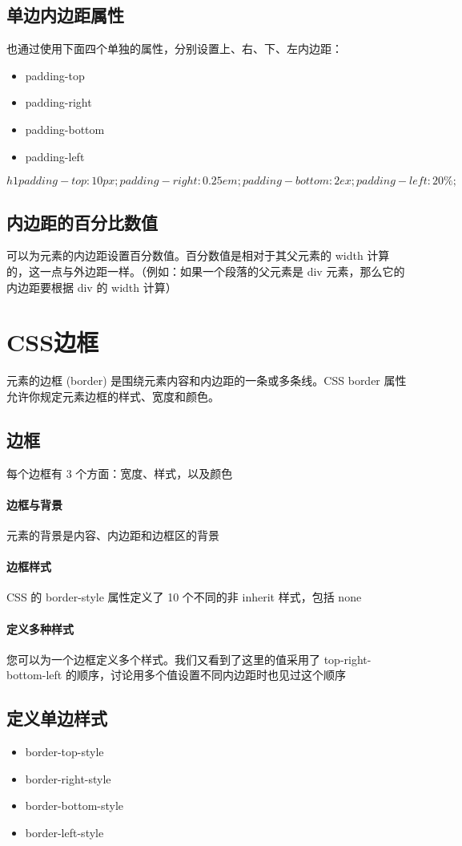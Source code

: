 \documentclass[10pt,UTF8]{ctexart}
\begin{document}
\subsection{单边内边距属性}
也通过使用下面四个单独的属性，分别设置上、右、下、左内边距：
\begin{itemize}
\item padding-top
\item padding-right
\item padding-bottom
\item padding-left
\end{itemize}
$h1 {padding-top: 10px;padding-right: 0.25em;padding-bottom: 2ex;padding-left: 20\%;}$\subsection{内边距的百分比数值}
可以为元素的内边距设置百分数值。百分数值是相对于其父元素的 width 计算的，这一点与外边距一样。（例如：如果一个段落的父元素是 div 元素，那么它的内边距要根据 div 的 width 计算）
\section{CSS边框}
元素的边框 (border) 是围绕元素内容和内边距的一条或多条线。CSS border 属性允许你规定元素边框的样式、宽度和颜色。
\subsection{边框}
每个边框有 3 个方面：宽度、样式，以及颜色
\paragraph{边框与背景}元素的背景是内容、内边距和边框区的背景
\paragraph{边框样式}CSS 的 border-style 属性定义了 10 个不同的非 inherit 样式，包括 none
\paragraph{定义多种样式}您可以为一个边框定义多个样式。我们又看到了这里的值采用了 top-right-bottom-left 的顺序，讨论用多个值设置不同内边距时也见过这个顺序
\subsection{定义单边样式}
\begin{itemize}
\item border-top-style
\item border-right-style
\item border-bottom-style
\item border-left-style
\end{itemize}
\end{document}
